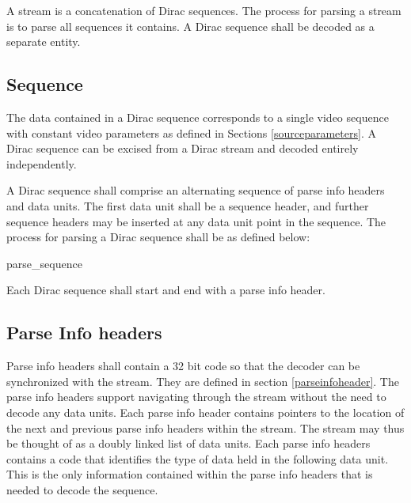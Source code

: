 A stream is a concatenation of Dirac sequences. The process for parsing a stream 
is to parse all sequences it contains. A Dirac sequence shall be decoded as a separate entity.

\subsection{Sequence}

The data contained in a Dirac sequence corresponds to a single video sequence with
constant video parameters as defined in Sections \ref{sourceparameters}.
A Dirac sequence can be excised from a Dirac stream and decoded entirely
independently.

A Dirac sequence shall comprise an alternating sequence of parse info headers and 
data units. The first data unit shall be a sequence header, and further sequence 
headers may be inserted at any data unit point in the sequence.
The process for parsing a Dirac sequence shall be as defined below:

\begin{pseudo}{parse\_sequence}{}
\bsCODE{\StateName=\{\}}
\bsCODE{\RefBuffer=\{\}}
    \bsEND
\bsEND
\end{pseudo}

Each Dirac sequence shall start and end with a parse info header. 

\subsection{Parse Info headers}

Parse info headers shall contain a 32 bit code so that the decoder can 
be synchronized with the stream. They are defined in section \ref{parseinfoheader}.
The parse info headers support navigating through the stream without the 
need to decode any data units. Each parse info header contains pointers 
to the location of the next and previous parse info headers within the stream. 
The stream may thus be thought of as a doubly linked list of data units.
Each parse info headers contains a code that identifies the type of data held 
in the following data unit. This is the only information contained within
the parse info headers that is needed to decode the sequence.


